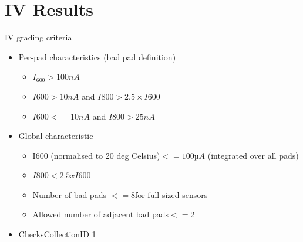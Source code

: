 \documentclass{beamer}
\begin{document}
  

\section{IV Results}

\begin{frame}{IV grading criteria}
   \begin{itemize}
       \item \alert{Per-pad} characteristics (\alert{bad pad} definition)
            \begin{itemize}
                \item $ {I}_{600} > 100 nA $
                \item $ I600 > 10 nA  $  and $ I800 > 2.5 \times I600 $
                \item $ I600 <= 10 nA $  and $ I800 > 25 nA $
            \end{itemize}
       \item \alert{Global} characteristic
            \begin{itemize}
                \item I600 (normalised to 20 deg Celsius)$ <= 100 µA $ (integrated over all pads)
                \item $ I800 < 2.5 x I600 $
                \item Number of bad pads $ <= 8 $for full-sized sensors
                \item Allowed number of adjacent bad pads$ <= 2$
            \end{itemize}
       \item ChecksCollectionID 1
   \end{itemize}

\end{frame}
\end{document}
